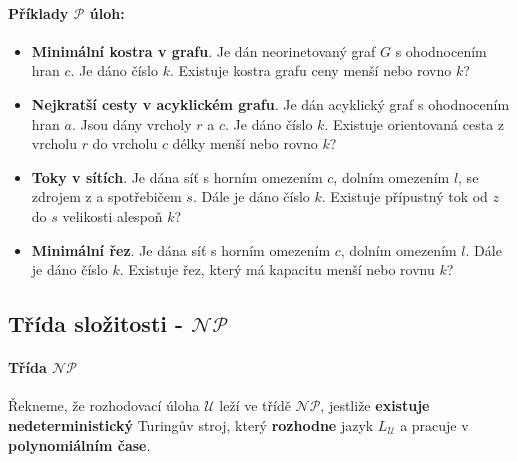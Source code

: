 \paragraph{Příklady $\mathcal{P}$ úloh:}
\begin{itemize}[itemsep=0pt]
    \item \textbf{\color{darkBrown}Minimální kostra v grafu}. Je dán neorinetovaný graf $G$ s ohodnocením hran $c$. Je dáno číslo $k$. Existuje kostra grafu ceny menší nebo rovno $k$?
    
    \item \textbf{\color{darkBrown}Nejkratší cesty v acyklickém grafu}. Je dán acyklický graf s ohodnocením hran $a$. Jsou dány vrcholy $r$ a $c$. Je dáno číslo $k$. Existuje orientovaná cesta z vrcholu $r$ do vrcholu $c$ délky menší nebo rovno $k$?
    
    \item \textbf{\color{darkBrown}Toky v sítích}. Je dána síť s horním omezením $c$, dolním omezením $l$, se zdrojem z a spotřebičem $s$. Dále je dáno číslo $k$. Existuje přípustný tok od $z$ do $s$ velikosti alespoň $k$?
    
    \item \textbf{\color{darkBrown}Minimální řez}. Je dána síť s horním omezením $c$, dolním omezením $l$. Dále je dáno číslo $k$. Existuje řez, který má kapacitu menší nebo rovnu $k$?
\end{itemize}

\subsection*{Třída složitosti - $\mathcal{NP}$}
\label{heading:np}

\paragraph{Třída $\mathcal{NP}$} Řekneme, že rozhodovací úloha $\mathcal{U}$ leží ve třídě $\mathcal{NP}$, jestliže \textbf{existuje nedeterministický} Turingův stroj, který \textbf{rozhodne} jazyk $L_\mathcal{U}$ a pracuje v \textbf{polynomiálním čase}.

